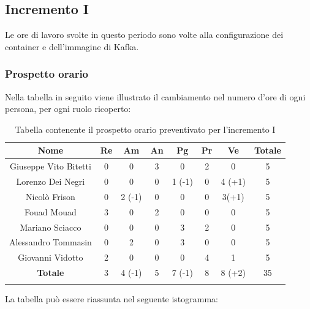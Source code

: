 		\pagebreak
				
		
		\subsection{Incremento I}
		Le ore di lavoro svolte in questo periodo sono volte alla configurazione dei container e dell'immagine  di Kafka. 
		\subsubsection{Prospetto orario}
			Nella tabella in seguito viene illustrato il cambiamento nel numero d'ore di ogni persona, per ogni ruolo ricoperto:
			
			\begin{longtable}{|c|c|c|c|c|c|c|c}
				\hline
				\rowcolor{lighter-grayer}
				\textbf{Nome} & \textbf{Re} & \textbf{Am} & \textbf{An} & \textbf{Pg}  & \textbf{Pr}   & \textbf{Ve} & \textbf{Totale} \\
				\hline
				\endfirsthead
				\hline
				Giuseppe Vito Bitetti & 0 & 0 & 3 & 0 & 2 & 0 & 5\\
				\hline
				\hline
				Lorenzo Dei Negri & 0 & 0 & 0 & 1 (-1) & 0 & 4 (+1) & 5\\
				\hline
				\hline
				Nicolò Frison & 0 & 2 (-1) & 0 & 0 & 0 & 3(+1) & 5\\
				\hline
				\hline
				Fouad Mouad & 3 & 0 & 2 & 0 & 0 & 0 & 5\\
				\hline
				\hline
				Mariano Sciacco & 0 & 0 & 0 & 3 & 2 & 0 & 5\\
				\hline
				\hline
				Alessandro Tommasin & 0 & 2 & 0 & 3 & 0 & 0 & 5\\
				\hline
				\hline
				Giovanni Vidotto & 2 & 0 & 0 & 0 & 4 & 1 & 5\\
				\hline 
				\textbf{Totale} & 3 &  4 (-1) & 5 & 7 (-1) & 8 & 8 (+2) & 35\\
				\hline 
				
				\caption{Tabella contenente il prospetto orario preventivato per l'incremento I}
			\end{longtable}
			
			La tabella può essere riassunta nel seguente istogramma:
			

